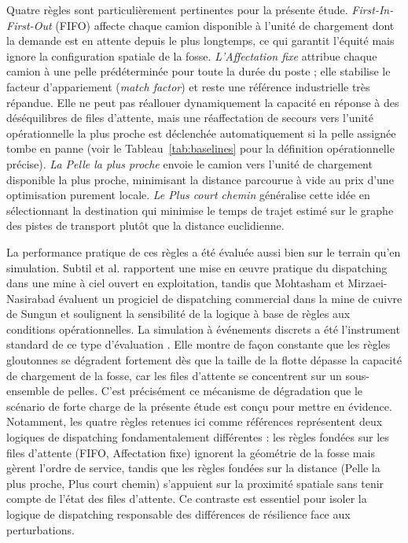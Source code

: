 \documentclass[11pt,a4paper]{article}
\begin{document}
Quatre règles sont particulièrement pertinentes pour la présente étude. \textit{First-In-First-Out} (FIFO) affecte chaque camion disponible à l'unité de chargement dont la demande est en attente depuis le plus longtemps, ce qui garantit l'équité mais ignore la configuration spatiale de la fosse. \textit{L'Affectation fixe} attribue chaque camion à une pelle prédéterminée pour toute la durée du poste ; elle stabilise le facteur d'appariement (\textit{match factor}) et reste une référence industrielle très répandue. Elle ne peut pas réallouer dynamiquement la capacité en réponse à des déséquilibres de files d'attente, mais une réaffectation de secours vers l'unité opérationnelle la plus proche est déclenchée automatiquement si la pelle assignée tombe en panne (voir le Tableau~\ref{tab:baselines} pour la définition opérationnelle précise). \textit{La Pelle la plus proche} envoie le camion vers l'unité de chargement disponible la plus proche, minimisant la distance parcourue à vide au prix d'une optimisation purement locale. \textit{Le Plus court chemin} généralise cette idée en sélectionnant la destination qui minimise le temps de trajet estimé sur le graphe des pistes de transport plutôt que la distance euclidienne.

La performance pratique de ces règles a été évaluée aussi bien sur le terrain qu'en simulation. Subtil et al. \cite{Subtil2011} rapportent une mise en œuvre pratique du dispatching dans une mine à ciel ouvert en exploitation, tandis que Mohtasham et Mirzaei-Nasirabad \cite{MehrnazMohtasham2023} évaluent un progiciel de dispatching commercial dans la mine de cuivre de Sungun et soulignent la sensibilité de la logique à base de règles aux conditions opérationnelles. La simulation à événements discrets a été l'instrument standard de ce type d'évaluation \cite{NecmettinCetin2004, MarceloFioroni2008, Zeng2022, MiladAbolghasemian2020}. Elle montre de façon constante que les règles gloutonnes se dégradent fortement dès que la taille de la flotte dépasse la capacité de chargement de la fosse, car les files d'attente se concentrent sur un sous-ensemble de pelles. C'est précisément ce mécanisme de dégradation que le scénario de forte charge de la présente étude est conçu pour mettre en évidence. Notamment, les quatre règles retenues ici comme références représentent deux logiques de dispatching fondamentalement différentes : les règles fondées sur les files d'attente (FIFO, Affectation fixe) ignorent la géométrie de la fosse mais gèrent l'ordre de service, tandis que les règles fondées sur la distance (Pelle la plus proche, Plus court chemin) s'appuient sur la proximité spatiale sans tenir compte de l'état des files d'attente. Ce contraste est essentiel pour isoler la logique de dispatching responsable des différences de résilience face aux perturbations.
\end{document}

